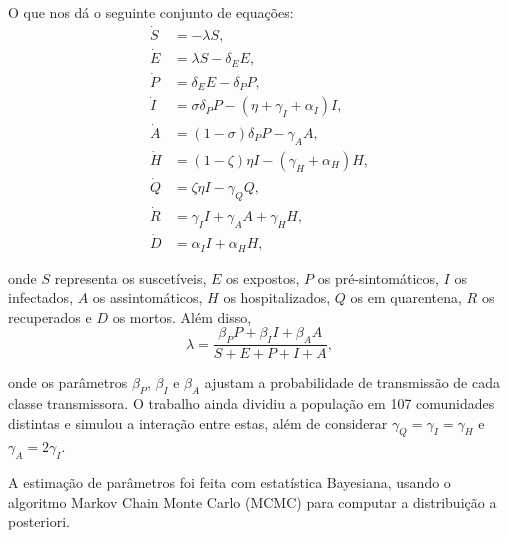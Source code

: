 \documentclass{article}
\begin{document}
O que nos dá o seguinte conjunto de equações:
\begin{equation*}
    \begin{split}
        \dot{S} & = -\lambda S,\\
        \dot{E} & = \lambda S - \delta_E E, \\
        \dot{P} & = \delta_E E - \delta_P P, \\
        \dot{I} & = \sigma \delta_P P - (\eta + \gamma_I + \alpha_I) I, \\
        \dot{A} & = (1-\sigma) \delta_P P - \gamma_A A, \\
        \dot{H} & = (1-\zeta) \eta I - (\gamma_H + \alpha_H) H, \\
        \dot{Q} & = \zeta \eta I - \gamma_Q Q, \\
        \dot{R} & = \gamma_I I + \gamma_A A + \gamma_H H, \\
        \dot{D} & = \alpha_I I + \alpha_H H,
    \end{split}
\end{equation*}

\noindent onde $S$ representa os suscetíveis, $E$ os expostos, $P$ os pré-sintomáticos, $I$ os infectados, $A$ os assintomáticos, $H$ os hospitalizados, $Q$ os em quarentena, $R$ os recuperados e $D$ os mortos. Além disso, 
\[\lambda = \frac{\beta_P P + \beta_I I + \beta_A A}{S + E + P + I + A},\]

\noindent onde os parâmetros $\beta_P$, $\beta_I$ e $\beta_A$ ajustam a probabilidade de transmissão de cada classe transmissora. O trabalho ainda dividiu a população em 107 comunidades distintas e simulou a interação entre estas, além de considerar $\gamma_Q = \gamma_I = \gamma_H$ e $\gamma_A = 2\gamma_I$.

A estimação de parâmetros foi feita com estatística Bayesiana, usando o algoritmo Markov Chain Monte Carlo (MCMC) para computar a distribuição a posteriori.
% 
\end{document}
